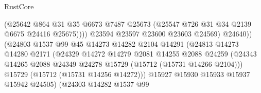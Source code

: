 \begin{lexlean}{RustCore}
\begin{coremodule}
                                              (@25642
                                                @864
                                                @31
                                                @35
                                                @6673
                                                @7487
                                                @25673
                                                (@25547 @726 @31 @34 @2139 @6675 @24416 @25675))))
                                          @23594
                                          @23597
                                          @23600
                                          @23603
                                          @24569)
                                        @24640))
                                    (@24803
                                      @1537
                                      @99
                                      @45
                                      @14273
                                      @14282
                                      @2104
                                      @14291
                                      (@24813
                                        @14273
                                        @14280
                                        @2171
                                        (@24329
                                          @14272
                                          @14279
                                          @2081
                                          @14255
                                          @2088
                                          @24259
                                          (@24343
                                            @14265
                                            @2088
                                            @24349
                                            @24278
                                            @15729
                                            (@15712 (@15731 @14266 @2104)))
                                          @15729
                                          (@15712 (@15731 @14256 @14272)))
                                        @15927
                                        @15930
                                        @15933
                                        @15937
                                        @15942
                                        @24505)
                                      (@24303
                                        @14282
                                        @1537
                                        @99

\end{coremodule}
\end{lexlean}
